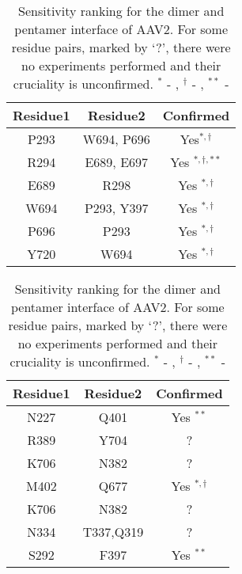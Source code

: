 \begin{table}[h]

\begin{minipage}{0.45\linewidth}
\begin{tabular}{ccc}\hline
Residue1 & Residue2 & Confirmed\\\hline\hline
P293 & W694, P696 & Yes$^{*, \dag}$\\
R294 & E689, E697 & Yes $^{*, \dag, **}$\\
E689 & R298 & Yes $^{*, \dag}$\\
W694 & P293, Y397 & Yes $^{*, \dag}$\\
P696 & P293 & Yes $^{*, \dag}$\\
Y720 & W694 & Yes $^{*, \dag}$\\\hline
\end{tabular}
\end{minipage}
\begin{minipage}{0.45\linewidth}
\begin{tabular}{ccc}\hline
Residue1 & Residue2 & Confirmed\\\hline\hline
N227 & Q401 & Yes $^{**}$\\
R389 & Y704 & ?\\
K706 & N382 & ?\\
M402 & Q677 & Yes $^{*, \dag}$\\
K706 & N382 & ?\\
N334 & T337,Q319 & ?\\
S292 & F397 & Yes $^{**}$\\\hline
\end{tabular}
\end{minipage}
\caption{Sensitivity ranking for the dimer and pentamer interface of AAV2. For
some residue pairs, marked by `?', there were no experiments performed and their 
cruciality is unconfirmed. $^*$ - \protect{}, $^\dag$ - 
\protect{}, $^{**}$ - \protect{} }
\label{table:virus}
\end{table}





